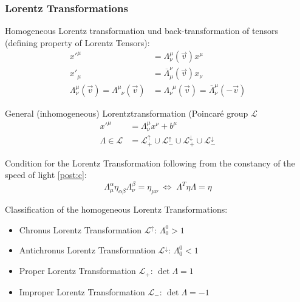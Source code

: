 		\subsubsection{Lorentz Transformations}
			\noindent
			Homogeneous Lorentz transformation und back-transformation of tensors (defining property of Lorentz Tensors):%
			\begin{equation}
				\begin{aligned}
					x'^\mu &= \Lambda^{\mu}_{\nu}(\vec{v}) x^\mu \\
					x'_\mu &= \overline{\Lambda}_\mu^{\nu}(\vec{v}) x_\nu \\
					\Lambda^{\mu}_{\nu}(\vec{v}) = \Lambda^{\mu}_{\phantom{\mu}\nu}(\vec{v}) &= \Lambda^{\phantom{\nu}\mu}_{\nu}(\vec{v}) = \overline{\Lambda}^{\mu}_{\nu}(-\vec{v})
				\end{aligned}
			\end{equation}

			\noindent
			General (inhomogeneous) Lorentztransformation (Poincaré group $\mathcal{L}$%
			\begin{equation}
				\begin{aligned}
					x'^\mu &= \Lambda^\mu_{\nu} x^\nu + b^\mu \\
					\Lambda \in \mathcal{L} &= \mathcal{L}^\uparrow_+ \cup \mathcal{L}^\uparrow_- \cup \mathcal{L}^\downarrow_+ \cup \mathcal{L}^\downarrow_-
				\end{aligned}
			\end{equation}

			\noindent
			Condition for the Lorentz Transformation following from the constancy of the speed of light \ref{post:c}:%
			\begin{equation}
				\Lambda^{\alpha}_{\mu} \eta_{\alpha\beta} \Lambda^{\beta}_{\nu} = \eta_{\mu\nu}
				 \;\Leftrightarrow\; \Lambda^T \eta \Lambda = \eta
			\end{equation}

			\noindent
			Classification of the homogeneous Lorentz Transformations:%
			\begin{itemize}
				\item Chronus Lorentz Transformation $\mathcal{L}^\uparrow$: $\Lambda^0_0 > 1$
				\item Antichronus Lorentz Transformation $\mathcal{L}^\downarrow$: $\Lambda^0_0 < 1$
				\item Proper Lorentz Transformation $\mathcal{L}_+$: $\det\Lambda = 1$
				\item Improper Lorentz Transformation $\mathcal{L}_-$: $\det\Lambda = -1$
			\end{itemize}

